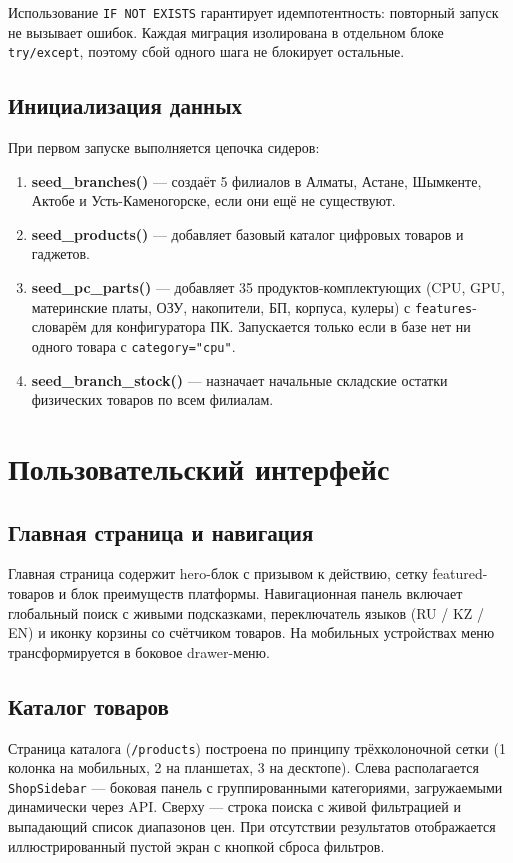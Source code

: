 \documentclass[14pt,a4paper]{extreport}
\begin{document}
Использование \texttt{IF NOT EXISTS} гарантирует идемпотентность: повторный запуск не вызывает ошибок. Каждая миграция изолирована в отдельном блоке \texttt{try/except}, поэтому сбой одного шага не блокирует остальные.

\subsection{Инициализация данных}

При первом запуске выполняется цепочка сидеров:

\begin{enumerate}
  \item \textbf{seed\_branches()} — создаёт 5 филиалов в Алматы, Астане, Шымкенте, Актобе и Усть-Каменогорске, если они ещё не существуют.
  \item \textbf{seed\_products()} — добавляет базовый каталог цифровых товаров и гаджетов.
  \item \textbf{seed\_pc\_parts()} — добавляет 35 продуктов-комплектующих (CPU, GPU, материнские платы, ОЗУ, накопители, БП, корпуса, кулеры) с \texttt{features}-словарём для конфигуратора ПК. Запускается только если в базе нет ни одного товара с \texttt{category="cpu"}.
  \item \textbf{seed\_branch\_stock()} — назначает начальные складские остатки физических товаров по всем филиалам.
\end{enumerate}

\section{Пользовательский интерфейс}

\subsection{Главная страница и навигация}

Главная страница содержит hero-блок с призывом к действию, сетку featured-товаров и блок преимуществ платформы. Навигационная панель включает глобальный поиск с живыми подсказками, переключатель языков (RU / KZ / EN) и иконку корзины со счётчиком товаров. На мобильных устройствах меню трансформируется в боковое drawer-меню.

\subsection{Каталог товаров}

Страница каталога (\texttt{/products}) построена по принципу трёхколоночной сетки (1 колонка на мобильных, 2 на планшетах, 3 на десктопе). Слева располагается \texttt{ShopSidebar} — боковая панель с группированными категориями, загружаемыми динамически через API. Сверху — строка поиска с живой фильтрацией и выпадающий список диапазонов цен. При отсутствии результатов отображается иллюстрированный пустой экран с кнопкой сброса фильтров.
\end{document}
